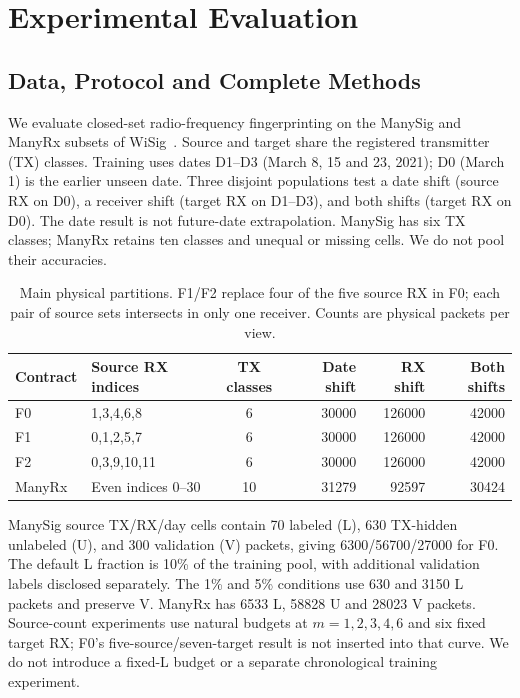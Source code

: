 \section{Experimental Evaluation}
\label{sec:experiments}
\subsection{Data, Protocol and Complete Methods}
We evaluate closed-set radio-frequency fingerprinting on the ManySig and ManyRx subsets of WiSig~\cite{wisig}. Source and target share the registered transmitter (TX) classes. Training uses dates D1--D3 (March 8, 15 and 23, 2021); D0 (March 1) is the earlier unseen date. Three disjoint populations test a date shift (source RX on D0), a receiver shift (target RX on D1--D3), and both shifts (target RX on D0). The date result is not future-date extrapolation. ManySig has six TX classes; ManyRx retains ten classes and unequal or missing cells. We do not pool their accuracies.

\begin{table}[!t]
\centering\footnotesize\setlength{\tabcolsep}{4pt}
\caption{Main physical partitions. F1/F2 replace four of the five source RX in F0; each pair of source sets intersects in only one receiver. Counts are physical packets per view.}
\label{tab:repl-data}
\begin{tabular*}{\textwidth}{@{\extracolsep{\fill}}llcrrr@{}}\toprule
Contract & Source RX indices & TX classes & Date shift & RX shift & Both shifts\\\midrule
F0 & 1,3,4,6,8 & 6 & 30000 & 126000 & 42000\\
F1 & 0,1,2,5,7 & 6 & 30000 & 126000 & 42000\\
F2 & 0,3,9,10,11 & 6 & 30000 & 126000 & 42000\\
ManyRx & Even indices 0--30 & 10 & 31279 & 92597 & 30424\\\bottomrule
\end{tabular*}\end{table}

ManySig source TX/RX/day cells contain 70 labeled (L), 630 TX-hidden unlabeled (U), and 300 validation (V) packets, giving 6300/56700/27000 for F0. The default L fraction is 10\% of the training pool, with additional validation labels disclosed separately. The 1\% and 5\% conditions use 630 and 3150 L packets and preserve V. ManyRx has 6533 L, 58828 U and 28023 V packets. Source-count experiments use natural budgets at $m=1,2,3,4,6$ and six fixed target RX; F0's five-source/seven-target result is not inserted into that curve. We do not introduce a fixed-L budget or a separate chronological training experiment.

